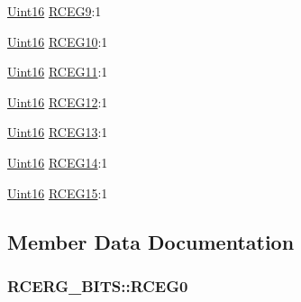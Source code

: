 \begin{DoxyCompactItemize}
\item 
\hyperlink{_d_s_p2833x___device_8h_a59a9f6be4562c327cbfb4f7e8e18f08b}{Uint16} \hyperlink{struct_r_c_e_r_g___b_i_t_s_ac33e6ea591d2dac9f10c66e28b856482}{R\+C\+E\+G9}\+:1
\item 
\hyperlink{_d_s_p2833x___device_8h_a59a9f6be4562c327cbfb4f7e8e18f08b}{Uint16} \hyperlink{struct_r_c_e_r_g___b_i_t_s_ad7dc6d2bf680f8c9fa3d2980a3ed27ac}{R\+C\+E\+G10}\+:1
\item 
\hyperlink{_d_s_p2833x___device_8h_a59a9f6be4562c327cbfb4f7e8e18f08b}{Uint16} \hyperlink{struct_r_c_e_r_g___b_i_t_s_a31fbd3b906095e97b98eb2658e9e38ab}{R\+C\+E\+G11}\+:1
\item 
\hyperlink{_d_s_p2833x___device_8h_a59a9f6be4562c327cbfb4f7e8e18f08b}{Uint16} \hyperlink{struct_r_c_e_r_g___b_i_t_s_a93f7fab3cd6772a8ae9d0aea5fc67136}{R\+C\+E\+G12}\+:1
\item 
\hyperlink{_d_s_p2833x___device_8h_a59a9f6be4562c327cbfb4f7e8e18f08b}{Uint16} \hyperlink{struct_r_c_e_r_g___b_i_t_s_aea589ce46d10680cb79c41bcfc61e1d0}{R\+C\+E\+G13}\+:1
\item 
\hyperlink{_d_s_p2833x___device_8h_a59a9f6be4562c327cbfb4f7e8e18f08b}{Uint16} \hyperlink{struct_r_c_e_r_g___b_i_t_s_aa2c02efcd84d8c4f42ad23d05b9dffb9}{R\+C\+E\+G14}\+:1
\item 
\hyperlink{_d_s_p2833x___device_8h_a59a9f6be4562c327cbfb4f7e8e18f08b}{Uint16} \hyperlink{struct_r_c_e_r_g___b_i_t_s_a7305f122d5a1a477b07d083bf390f211}{R\+C\+E\+G15}\+:1
\end{DoxyCompactItemize}


\subsection{Member Data Documentation}
\hypertarget{struct_r_c_e_r_g___b_i_t_s_ac7e8c66490a11cf78d2d84137c4c1199}{}
\subsubsection[{R\+C\+E\+G0}]{ R\+C\+E\+R\+G\+\_\+\+B\+I\+T\+S\+::\+R\+C\+E\+G0}\label{struct_r_c_e_r_g___b_i_t_s_ac7e8c66490a11cf78d2d84137c4c1199}
\hypertarget{struct_r_c_e_r_g___b_i_t_s_adff1f4f5e3f92fcac48b63d3373fcbae}{}
